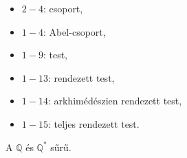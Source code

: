 \begin{blueBox}
  \begin{itemize}
    \item $2 - 4$: csoport,
    \item $1 - 4$: Abel-csoport,
    \item $1 - 9$: test,
    \item $1 - 13$: rendezett test,
    \item $1 - 14$: arkhimédészien rendezett test,
    \item $1 - 15$: teljes rendezett test.
  \end{itemize}
\end{blueBox}

\begin{statement}
  A $\mathbb Q$ és $\mathbb Q^*$ sűrű.
\end{statement}